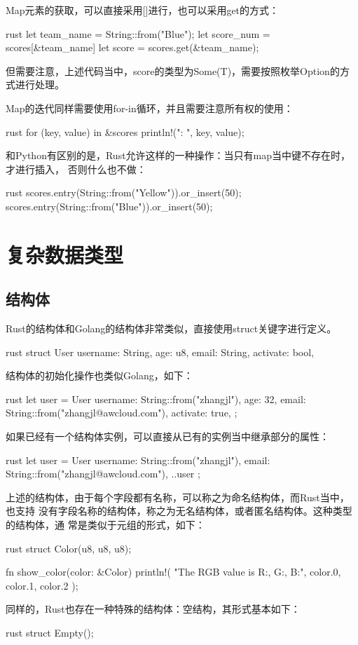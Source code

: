 Map元素的获取，可以直接采用[]进行，也可以采用get的方式：
\begin{code-block}{rust}
let team_name = String::from("Blue");
let score_num = scores[&team_name]
let score = scores.get(&team_name);
\end{code-block}
但需要注意，上述代码当中，score的类型为Some(T)，需要按照枚举Option的方式进行处理。

Map的迭代同样需要使用for-in循环，并且需要注意所有权的使用：
\begin{code-block}{rust}
for (key, value) in &scores {
    println!("{}: {}", key, value);
}
\end{code-block}

和Python有区别的是，Rust允许这样的一种操作：当只有map当中键不存在时，才进行插入，
否则什么也不做：
\begin{code-block}{rust}
scores.entry(String::from("Yellow")).or_insert(50);
scores.entry(String::from("Blue")).or_insert(50);
\end{code-block}

\section{复杂数据类型}
\subsection{结构体}
Rust的结构体和Golang的结构体非常类似，直接使用struct关键字进行定义。
\begin{code-block}{rust}
struct User {
    username: String,
    age: u8,
    email: String,
    activate: bool,
}
\end{code-block}
结构体的初始化操作也类似Golang，如下：
\begin{code-block}{rust}
let user = User {
    username: String::from("zhangjl"),
    age: 32,
    email: String::from("zhangjl@awcloud.com"),
    activate: true,
};
\end{code-block}
如果已经有一个结构体实例，可以直接从已有的实例当中继承部分的属性：
\begin{code-block}{rust}
let user = User {
    username: String::from("zhangjl"),
    email: String::from("zhangjl@awcloud.com"),
    ..user
};
\end{code-block}

上述的结构体，由于每个字段都有名称，可以称之为命名结构体，而Rust当中，也支持
没有字段名称的结构体，称之为无名结构体，或者匿名结构体。这种类型的结构体，通
常是类似于元组的形式，如下：
\begin{code-block}{rust}
struct Color(u8, u8, u8);

fn show_color(color: &Color) {
    println!(
        "The RGB value is R:{}, G:{}, B:{}",
        color.0, color.1, color.2
    );
}
\end{code-block}
同样的，Rust也存在一种特殊的结构体：空结构，其形式基本如下：
\begin{code-block}{rust}
struct Empty();
\end{code-block}

